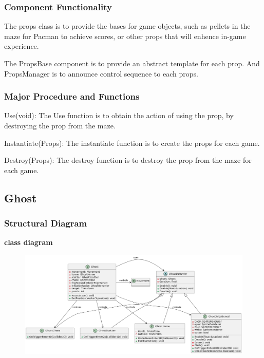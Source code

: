 \documentclass[11pt]{article}
\begin{document}
\subsubsection{Component Functionality}
The props class is to provide the bases for game objects, such as pellets in the maze for Pacman to achieve scores, or other props that will enhence in-game experience.

The PropsBase component is to provide an abstract template for each prop. And PropsManager is to announce control sequence to each props.
\subsubsection{Major Procedure and Functions}
Use(void): The Use function is to obtain the action of using the prop, by destroying the prop from the maze.

Instantiate(Props): The instantiate function is to create the props for each game.

Destroy(Props): The destroy function is to destroy the prop from the maze for each game.

\subsection{Ghost}
\subsubsection{Structural Diagram}
\textbf{class diagram}\\
\begin{figure}[H]
    \centering
    \includegraphics*[scale=0.25]{Ghost_Class.png}
\end{figure}
\end{document}
